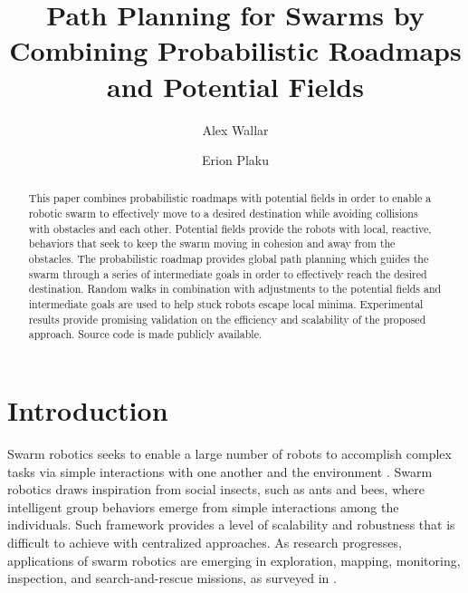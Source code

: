 \documentclass{llncs}
\begin{document}
\frontmatter
\pagestyle{headings}  
\addtocmark{} 

\mainmatter 

\title{Path Planning for Swarms by Combining Probabilistic Roadmaps and
  Potential Fields}

\author{Alex Wallar \and Erion Plaku}



\maketitle
\begin{abstract}
This paper combines probabilistic roadmaps with potential
fields in order to enable a robotic swarm to effectively move to a
desired destination while avoiding collisions with obstacles and each
other. Potential fields provide the robots with local, reactive,
behaviors that seek to keep the swarm moving in cohesion and away from
the obstacles. The probabilistic roadmap provides global path planning
which guides the swarm through a series of intermediate goals in order
to effectively reach the desired destination. Random walks in
combination with adjustments to the potential fields and intermediate
goals are used to help stuck robots escape local minima.  Experimental
results provide promising validation on the efficiency and scalability
of the proposed approach. Source code is made publicly available.
\end{abstract}


\section{Introduction}
\label{sec:Intro}


Swarm robotics seeks to enable a large number of robots to accomplish
complex tasks via simple interactions with one another and the
environment \cite{reynolds1987flocks}.  Swarm robotics draws
inspiration from social insects, such as ants and bees, where
intelligent group behaviors emerge from simple interactions among the
individuals. Such framework provides a level of scalability and
robustness that is difficult to achieve with centralized
approaches. As research progresses, applications of swarm robotics are
emerging in exploration, mapping,
monitoring, inspection, and search-and-rescue missions, as surveyed in
\cite{swarm,swarmReview12}.
\end{document}
